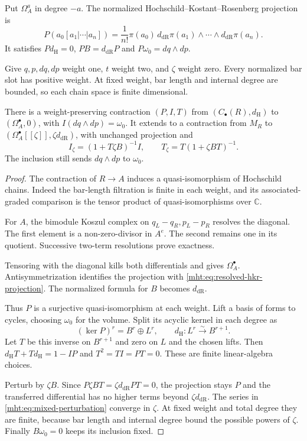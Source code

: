 Put $\Omega_A^a$ in degree $-a$. The normalized
Hochschild--Kostant--Rosenberg projection is
\begin{equation}\label{mht:eq:resolved-hkr-projection}
 P(a_0[a_1|\cdots|a_n])
 =\frac1{n!}\pi(a_0)\,
       d_{\mathrm{dR}}\pi(a_1)\wedge\cdots\wedge
       d_{\mathrm{dR}}\pi(a_n).
\end{equation}
It satisfies $Pd_{\mathrm H}=0$, $PB=d_{\mathrm{dR}}P$
and $P\omega_0=dq\wedge dp$.

Give $q,p,dq,dp$ weight one, $t$ weight two, and $\zeta$
weight zero. Every normalized bar slot has positive weight.
At fixed weight, bar length and internal degree are bounded,
so each chain space is finite dimensional.

\begin{proposition}\label{mht:prop:mixed-volume-contraction}
There is a weight-preserving contraction $(P,I,T)$ from
$(C_\bullet(R),d_{\mathrm H})$ to $(\Omega_A^\bullet,0)$,
with $I(dq\wedge dp)=\omega_0$. It extends to a contraction
from $M_R$ to $(\Omega_A^\bullet[[\zeta]],\zeta d_{\mathrm{dR}})$,
with unchanged projection and
\begin{equation}\label{mht:eq:mixed-perturbation}
 I_\zeta=(1+T\zeta B)^{-1}I,
 \qquad T_\zeta=T(1+\zeta BT)^{-1}.
\end{equation}
The inclusion still sends $dq\wedge dp$ to $\omega_0$.
\end{proposition}

\begin{proof}
The contraction of $R\to A$ induces a quasi-isomorphism of
Hochschild chains. Indeed the bar-length filtration is finite
in each weight, and its associated-graded comparison is the
tensor product of quasi-isomorphisms over $\mathbb C$.

For $A$, the bimodule Koszul complex on
$q_L-q_R,p_L-p_R$ resolves the diagonal. The first element
is a non-zero-divisor in $A^e$. The second remains one in
its quotient. Successive two-term resolutions prove exactness.

Tensoring with the diagonal kills both differentials and
gives $\Omega_A^\bullet$. Antisymmetrization identifies the
projection with \eqref{mht:eq:resolved-hkr-projection}.
The normalized formula for $B$ becomes $d_{\mathrm{dR}}$.

Thus $P$ is a surjective quasi-isomorphism at each weight.
Lift a basis of forms to cycles, choosing $\omega_0$ for the
volume. Split its acyclic kernel in each degree as
\[
 (\ker P)^r=B^r\oplus L^r,\qquad
 d_{\mathrm H}:L^r\xrightarrow{\sim}B^{r+1}.
\]
Let $T$ be this inverse on $B^{r+1}$ and zero on $L$ and
the chosen lifts. Then
$d_{\mathrm H}T+Td_{\mathrm H}=1-IP$ and
$T^2=TI=PT=0$. These are finite linear-algebra choices.

Perturb by $\zeta B$. Since $P\zeta BT
=\zeta d_{\mathrm{dR}}PT=0$, the projection stays $P$ and
the transferred differential has no higher terms beyond
$\zeta d_{\mathrm{dR}}$. The series in
\eqref{mht:eq:mixed-perturbation} converge in $\zeta$.
At fixed weight and total degree they are finite, because
bar length and internal degree bound the possible powers
of $\zeta$. Finally $B\omega_0=0$ keeps its inclusion fixed.
\end{proof}

